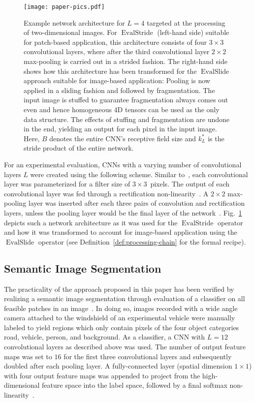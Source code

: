 \documentclass[journal]{IEEEtran}
\DeclareMathOperator{\EvalStride}{EvalStride}
\DeclareMathOperator{\EvalSlide}{EvalSlide}
\begin{document}
\begin{figure}[t]
  \centering
  \texttt{[image: paper-pics.pdf]}
  \caption{Example network architecture for $L = 4$ targeted at the processing of two-dimensional images.
    For $\EvalStride$ (left-hand side) suitable for patch-based application, this architecture consists of four $3\times 3$ convolutional layers, where after the third convolutional layer $2\times 2$ max-pooling is carried out in a strided fashion.
    The right-hand side shows how this architecture has been transformed for the $\EvalSlide$ approach suitable for image-based application:
    Pooling is now applied in a sliding fashion and followed by fragmentation.
    The input image is stuffed to guarantee fragmentation always comes out even and hence homogeneous 4D tensors can be used as the only data structure.
    The effects of stuffing and fragmentation are undone in the end, yielding an output for each pixel in the input image.
    Here, $B$ denotes the entire CNN's receptive field size and $k_L^*$ is the stride product of the entire network.}
  \label{fig:evalslide-net}
\end{figure}

For an experimental evaluation, CNNs with a varying number of convolutional layers $L$ were created using the following scheme.
Similar to~\cite{Simonyan2015}, each convolutional layer was parameterized for a filter size of $3\times 3$~pixels.
The output of each convolutional layer was fed through a rectification non-linearity~\cite{Sanger1989a}.
A $2\times 2$ max-pooling layer was inserted after each three pairs of convolution and rectification layers, unless the pooling layer would be the final layer of the network~\cite{Simonyan2015}.
Fig.~\ref{fig:evalslide-net} depicts such a network architecture as it was used for the $\EvalStride$ operator and how it was transformed to account for image-based application using the $\EvalSlide$ operator (see Definition~\ref{def:processing-chain} for the formal recipe).

\subsection{Semantic Image Segmentation}
The practicality of the approach proposed in this paper has been verified by realizing a semantic image segmentation through evaluation of a classifier on all feasible patches in an image~\cite{Ning2005,Grangier2009,Farabet2013}.
In doing so, images recorded with a wide angle camera attached to the windshield of an experimental vehicle were manually labeled to yield regions which only contain pixels of the four object categories road, vehicle, person, and background.
As a classifier, a CNN with $L = 12$ convolutional layers as described above was used.
The number of output feature maps was set to $16$ for the first three convolutional layers and subsequently doubled after each pooling layer.
A fully-connected layer (spatial dimension $1\times 1$) with four output feature maps was appended to project from the high-dimensional feature space into the label space, followed by a final softmax non-linearity~\cite{Bishop1995}.
\end{document}
